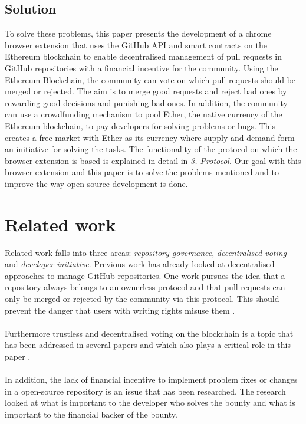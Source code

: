 \documentclass[sigconf]{acmart}
\begin{document}
\subsection{Solution}
To solve these problems, this paper presents the development of a chrome browser extension that uses the GitHub API  \cite{git2021api} and 
smart contracts \cite{eth2021contracts} on the Ethereum blockchain \cite{eth2021doc} to enable decentralised management of pull requests in GitHub repositories with a 
financial incentive for the community. Using the Ethereum Blockchain, the community can vote on which pull requests should be 
merged or rejected. The aim is to merge good requests and reject bad ones by rewarding good decisions and punishing bad ones. 
In addition, the community can 
use a crowdfunding mechanism to pool Ether, the native currency of the Ethereum blockchain, to pay developers for solving problems 
or bugs. This creates a free market with Ether as its currency where supply and demand form an initiative for solving the tasks. The functionality of the protocol on which the browser extension is based is explained in detail in \textit{3. Protocol}. Our goal with
 this browser extension and this paper is to solve the problems mentioned and to improve the way open-source development 
is done.

\section{Related work}
Related work falls into three areas: \textit{repository governance}, \textit{decentralised voting} and \textit{developer initiative}. 
Previous work has already looked at decentralised approaches to manage GitHub repositories. One work pursues the idea that 
a repository always belongs to an ownerless protocol and that pull requests can only be merged or rejected by the community 
via this protocol. This should prevent the danger that users with writing rights misuse them \cite{ulrich2020dev}. \\ \\
Furthermore trustless and decentralised voting on the blockchain is a topic that has been addressed in several papers 
and which also plays a critical role in this paper \cite{khoury2018decentralized, ulrich2020dev}. \\ \\
In addition, the lack of financial incentive to implement problem fixes or changes in a open-source repository is an issue that 
has been researched. The research looked at what is important to the developer who solves the bounty and what is 
important to the financial backer of 
the bounty. \cite{zhou2019bounties}
\end{document}
